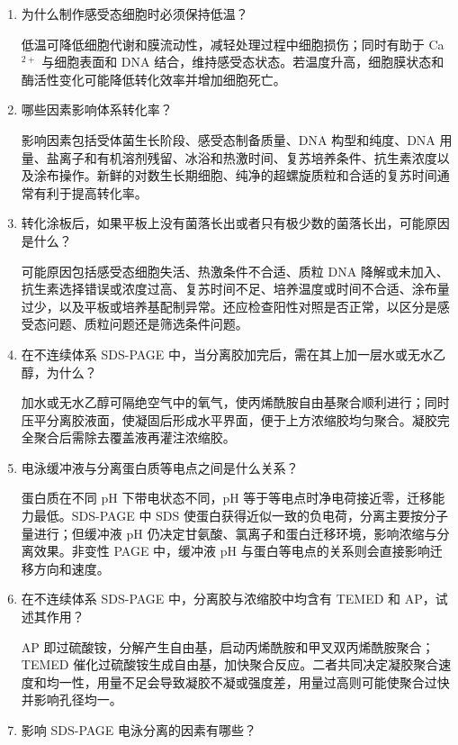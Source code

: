 \documentclass[a4paper]{article}
\begin{document}
\begin{enumerate}[label=\arabic*.]
	\item 为什么制作感受态细胞时必须保持低温？

	低温可降低细胞代谢和膜流动性，减轻处理过程中细胞损伤；同时有助于 Ca$^{2+}$ 与细胞表面和 DNA 结合，维持感受态状态。若温度升高，细胞膜状态和酶活性变化可能降低转化效率并增加细胞死亡。

	\item 哪些因素影响体系转化率？

	影响因素包括受体菌生长阶段、感受态制备质量、DNA 构型和纯度、DNA 用量、盐离子和有机溶剂残留、冰浴和热激时间、复苏培养条件、抗生素浓度以及涂布操作。新鲜的对数生长期细胞、纯净的超螺旋质粒和合适的复苏时间通常有利于提高转化率。

	\item 转化涂板后，如果平板上没有菌落长出或者只有极少数的菌落长出，可能原因是什么？

	可能原因包括感受态细胞失活、热激条件不合适、质粒 DNA 降解或未加入、抗生素选择错误或浓度过高、复苏时间不足、培养温度或时间不合适、涂布量过少，以及平板或培养基配制异常。还应检查阳性对照是否正常，以区分是感受态问题、质粒问题还是筛选条件问题。

	\item 在不连续体系 SDS-PAGE 中，当分离胶加完后，需在其上加一层水或无水乙醇，为什么？

	加水或无水乙醇可隔绝空气中的氧气，使丙烯酰胺自由基聚合顺利进行；同时压平分离胶液面，使凝固后形成水平界面，便于上方浓缩胶均匀聚合。凝胶完全聚合后需除去覆盖液再灌注浓缩胶。

	\item 电泳缓冲液与分离蛋白质等电点之间是什么关系？

	蛋白质在不同 pH 下带电状态不同，pH 等于等电点时净电荷接近零，迁移能力最低。SDS-PAGE 中 SDS 使蛋白获得近似一致的负电荷，分离主要按分子量进行；但缓冲液 pH 仍决定甘氨酸、氯离子和蛋白迁移环境，影响浓缩与分离效果。非变性 PAGE 中，缓冲液 pH 与蛋白等电点的关系则会直接影响迁移方向和速度。

	\item 在不连续体系 SDS-PAGE 中，分离胶与浓缩胶中均含有 TEMED 和 AP，试述其作用？

	AP 即过硫酸铵，分解产生自由基，启动丙烯酰胺和甲叉双丙烯酰胺聚合；TEMED 催化过硫酸铵生成自由基，加快聚合反应。二者共同决定凝胶聚合速度和均一性，用量不足会导致凝胶不凝或强度差，用量过高则可能使聚合过快并影响孔径均一。

	\item 影响 SDS-PAGE 电泳分离的因素有哪些？


\end{enumerate}
\end{document}
